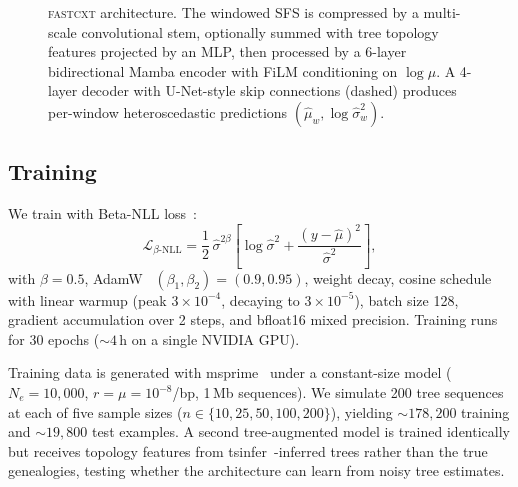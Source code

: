 \documentclass{article}
\begin{document}
\begin{figure}[t]
\caption{\textsc{fastcxt} architecture. The windowed SFS is compressed by a multi-scale
convolutional stem, optionally summed with tree topology features projected by an MLP, then
processed by a 6-layer bidirectional Mamba encoder with FiLM conditioning on $\log\mu$.
A 4-layer decoder with U-Net-style skip connections (dashed) produces per-window
heteroscedastic predictions $(\hat{\mu}_w, \log\hat{\sigma}^2_w)$.}
\label{fig:architecture}
\end{figure}

\subsection{Training}

We train with Beta-NLL loss~\citep{seitzer2022pitfalls}:
\begin{equation}
\mathcal{L}_{\beta\text{-NLL}} = \frac{1}{2}\,\hat{\sigma}^{2\beta}
\left[\log\hat{\sigma}^2 + \frac{(y - \hat{\mu})^2}{\hat{\sigma}^2}\right],
\label{eq:betanll}
\end{equation}
with $\beta = 0.5$, AdamW~\citep{loshchilov2019decoupled}
$(\beta_1, \beta_2) = (0.9, 0.95)$, weight decay, cosine schedule with linear warmup
(peak $3 {\times} 10^{-4}$, decaying to $3 {\times} 10^{-5}$), batch size 128, gradient
accumulation over 2 steps, and bfloat16 mixed precision. Training runs for 30 epochs
(${\sim}4$\,h on a single NVIDIA GPU).

Training data is generated with msprime~\citep{baumdicker2022efficient} under a constant-size
model ($N_e = 10{,}000$, $r = \mu = 10^{-8}$/bp, 1\,Mb sequences). We simulate 200 tree
sequences at each of five sample sizes ($n \in \{10, 25, 50, 100, 200\}$), yielding
${\sim}178{,}200$ training and ${\sim}19{,}800$ test examples. A second tree-augmented model
is trained identically but receives topology features from
tsinfer~\citep{kelleher2019inferring}-inferred trees rather than the true genealogies, testing
whether the architecture can learn from noisy tree estimates.
\end{document}
